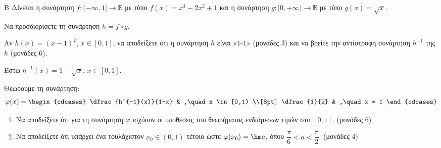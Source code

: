 \begin{thema}{Β}
Δίνεται η συνάρτηση $f: (-\infty, 1] \to \mathbb{R}$ με τύπο $f(x) = x^4 - 2x^2 + 1$ και η συνάρτηση $g: [0, +\infty) \to \mathbb{R}$ με τύπο $g(x) = \sqrt{x}$.
\begin{erwthma}
    \item Να προσδιορίσετε τη συνάρτηση $h = f \circ g$. 

    \item Αν $h(x) = (x-1)^2$, $x \in [0,1]$, να αποδείξετε ότι η συνάρτηση $h$ είναι «$1$-$1$» (μονάδες 3) και να βρείτε την αντίστροφη συνάρτηση $h^{-1}$ της $h$ (μονάδες 6). 

    \item Έστω $h^{-1}(x) = 1 - \sqrt{x}$, $x \in [0,1]$.

    Θεωρούμε τη συνάρτηση:
    \[
    \varphi(x) =
    \begin{cdcases}
    \dfrac{h^{-1}(x)}{1-x} & ,\quad x \in [0,1) \\[8pt]
    \dfrac{1}{2} & ,\quad x = 1
    \end{cdcases}
    \]
    \begin{enumerate}[label=(\roman*)]
        \item Να αποδείξετε ότι για τη συνάρτηση $\varphi$ ισχύουν οι υποθέσεις του θεωρήματος ενδιάμεσων τιμών στο $[0,1]$. \hfill (μονάδες 6)
        \item Να αποδείξετε ότι υπάρχει ένα τουλάχιστον $x_0 \in (0,1)$ τέτοιο ώστε $\varphi(x_0) = \hm a$, όπου $\dfrac{\pi}{6} < a < \dfrac{\pi}{2}$. \hfill (μονάδες 4)
    \end{enumerate}
\end{erwthma}
\end{thema}

